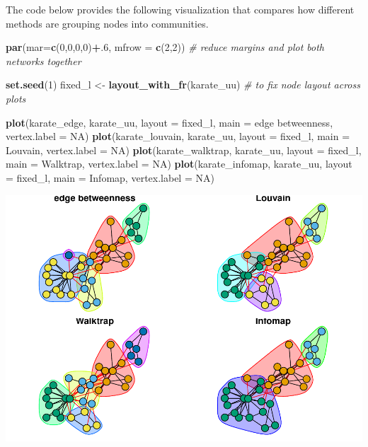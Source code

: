 \documentclass[
]{book}
\newenvironment{Shaded}{\begin{snugshade}}{\end{snugshade}}
\newcommand{\AttributeTok}[1]{\textcolor[rgb]{0.13,0.29,0.53}{#1}}
\newcommand{\CommentTok}[1]{\textcolor[rgb]{0.56,0.35,0.01}{\textit{#1}}}
\newcommand{\ConstantTok}[1]{\textcolor[rgb]{0.56,0.35,0.01}{#1}}
\newcommand{\DecValTok}[1]{\textcolor[rgb]{0.00,0.00,0.81}{#1}}
\newcommand{\FunctionTok}[1]{\textcolor[rgb]{0.13,0.29,0.53}{\textbf{#1}}}
\newcommand{\NormalTok}[1]{#1}
\newcommand{\OtherTok}[1]{\textcolor[rgb]{0.56,0.35,0.01}{#1}}
\newcommand{\SpecialCharTok}[1]{\textcolor[rgb]{0.81,0.36,0.00}{\textbf{#1}}}
\newcommand{\StringTok}[1]{\textcolor[rgb]{0.31,0.60,0.02}{#1}}
\begin{document}
The code below provides the following visualization that compares how different methods are grouping nodes into communities.

\begin{Shaded}
\begin{Highlighting}[]
\FunctionTok{par}\NormalTok{(}\AttributeTok{mar=}\FunctionTok{c}\NormalTok{(}\DecValTok{0}\NormalTok{,}\DecValTok{0}\NormalTok{,}\DecValTok{0}\NormalTok{,}\DecValTok{0}\NormalTok{)}\SpecialCharTok{+}\NormalTok{.}\DecValTok{6}\NormalTok{, }\AttributeTok{mfrow =} \FunctionTok{c}\NormalTok{(}\DecValTok{2}\NormalTok{,}\DecValTok{2}\NormalTok{)) }\CommentTok{\# reduce margins and plot both networks together}

\FunctionTok{set.seed}\NormalTok{(}\DecValTok{1}\NormalTok{)}
\NormalTok{fixed\_l }\OtherTok{\textless{}{-}} \FunctionTok{layout\_with\_fr}\NormalTok{(karate\_uu) }\CommentTok{\# to fix node layout across plots }

\FunctionTok{plot}\NormalTok{(karate\_edge, karate\_uu, }\AttributeTok{layout =}\NormalTok{ fixed\_l, }\AttributeTok{main =} \StringTok{\textquotesingle{}edge betweenness\textquotesingle{}}\NormalTok{, }\AttributeTok{vertex.label =} \ConstantTok{NA}\NormalTok{)}
\FunctionTok{plot}\NormalTok{(karate\_louvain, karate\_uu, }\AttributeTok{layout =}\NormalTok{ fixed\_l, }\AttributeTok{main =} \StringTok{\textquotesingle{}Louvain\textquotesingle{}}\NormalTok{, }\AttributeTok{vertex.label =} \ConstantTok{NA}\NormalTok{)}
\FunctionTok{plot}\NormalTok{(karate\_walktrap, karate\_uu, }\AttributeTok{layout =}\NormalTok{ fixed\_l, }\AttributeTok{main =} \StringTok{\textquotesingle{}Walktrap\textquotesingle{}}\NormalTok{, }\AttributeTok{vertex.label =} \ConstantTok{NA}\NormalTok{)}
\FunctionTok{plot}\NormalTok{(karate\_infomap, karate\_uu, }\AttributeTok{layout =}\NormalTok{ fixed\_l, }\AttributeTok{main =} \StringTok{\textquotesingle{}Infomap\textquotesingle{}}\NormalTok{, }\AttributeTok{vertex.label =} \ConstantTok{NA}\NormalTok{)}
\end{Highlighting}
\end{Shaded}

\includegraphics{bookdown-demo_files/figure-latex/unnamed-chunk-148-1.pdf}
\end{document}
